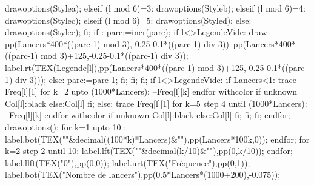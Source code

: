 {\begin{Geometrie}[CoinBG={u*(-5,0)},CoinHD={u*(7.5,7.5)}]
    drawoptions(Stylea);
    elseif (l mod 6)=3:
    drawoptions(Styleb);
    elseif (l mod 6)=4:
    drawoptions(Stylec);
    elseif (l mod 6)=5:
    drawoptions(Styled);
    else:
    drawoptions(Stylee);
    fi;
    if :
    parc:=incr(parc);
    if l<>LegendeVide:
    draw pp(Lancers*400*((parc-1) mod 3),-0.25-0.1*((parc-1) div 3))--pp(Lancers*400*((parc-1) mod 3)+125,-0.25-0.1*((parc-1) div 3));
    label.rt(TEX(Legende[l]),pp(Lancers*400*((parc-1) mod 3)+125,-0.25-0.1*((parc-1) div 3)));
    else:
    parc:=parc-1;
    fi;
    fi;
    fi;
    if l<>LegendeVide:
      if Lancers<1:
        trace Freq[l][1]
        for k=2 upto (1000*Lancers):
          --Freq[l][k]
        endfor withcolor if unknown Col[l]:black else:Col[l] fi;
      else:
        trace Freq[l][1]
        for k=5 step 4 until (1000*Lancers):
          --Freq[l][k]
        endfor withcolor if unknown Col[l]:black else:Col[l] fi;
      fi;
    fi;
    endfor;
   drawoptions();
    for k=1 upto 10 :
    label.bot(TEX("\scriptsize\num{"&decimal((100*k)*Lancers)&"}"),pp(Lancers*100k,0));
    endfor;
    for k=2 step 2 until 10:
    label.lft(TEX("\scriptsize\num{"&decimal(k/10)&"}"),pp(0,k/10));
    endfor;
    label.llft(TEX("\scriptsize 0"),pp(0,0));
    label.urt(TEX("Fréquence"),pp(0,1));
    label.bot(TEX("Nombre de lancers"),pp(0.5*Lancers*(1000+200),-0.075));
  \end{Geometrie}
  \fi
}%